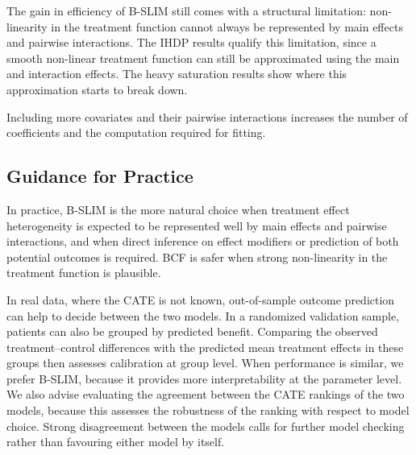 \documentclass[12pt]{article}
\newcommand{\rev}[1]{\ifdefined\ReviewChanges{\color{revisiongreen}#1}\else#1\fi}
\begin{document}
The gain in efficiency \rev{of B-SLIM} still comes with a structural limitation: non-linearity in the treatment function cannot always be represented by main effects and pairwise interactions. The IHDP results qualify this limitation, since a smooth non-linear treatment function can still be approximated using the main and interaction effects. The heavy saturation results show where this approximation starts to break down.

Including more covariates and their pairwise interactions increases the number of coefficients and the computation required for fitting.

\subsection{Guidance for Practice}
In practice, B-SLIM is the more natural choice when treatment effect heterogeneity is expected to be represented well by main effects and pairwise interactions, and when direct inference on effect modifiers or prediction of both potential outcomes is required. BCF is safer when strong non-linearity in the treatment function is plausible.

In real data, where the CATE is not known, out-of-sample outcome prediction can help to decide between the two models. In a randomized validation sample, patients can also be grouped by predicted benefit. Comparing the observed treatment--control differences with the predicted mean treatment effects in these groups then assesses calibration at group level. When performance is similar, we prefer B-SLIM, because it provides more interpretability at the parameter level. We also advise evaluating the agreement between the CATE rankings of the two models, because this assesses the robustness of the ranking with respect to model choice. Strong disagreement between the models calls for further model checking rather than favouring either model by itself.
\end{document}
